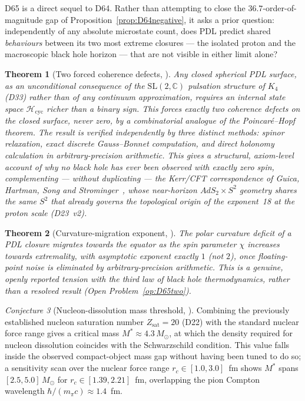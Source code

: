 \documentclass[11pt,a4paper]{article}
\theoremstyle{plain}
\newtheorem{theorem}{Theorem}[section]
\theoremstyle{definition}
\theoremstyle{remark}
\newtheorem{conjecture}[theorem]{Conjecture}
\newcommand{\Kfour}{K_4}
\newcommand{\Zsat}{Z_{\mathrm{sat}}}
\begin{document}
D65 is a direct sequel to D64. Rather than attempting to close the $36.7$-order-of-magnitude gap of Proposition~\ref{prop:D64negative}, it asks a prior question: independently of any absolute microstate count, does PDL predict shared \emph{behaviours} between its two most extreme closures --- the isolated proton and the macroscopic black hole horizon --- that are not visible in either limit alone?

\begin{theorem}[Two forced coherence defects, \cite{D65}]
\label{thm:2defects}
Any closed spherical PDL surface, as an unconditional consequence of the $\mathrm{SL}(2,\mathbb{C})$ pulsation structure of $\Kfour$ (D33) rather than of any continuum approximation, requires an internal state space $\mathcal{H}_{\mathrm{cyc}}$ richer than a binary sign. This forces exactly two coherence defects on the closed surface, never zero, by a combinatorial analogue of the Poincar\'e--Hopf theorem. The result is verified independently by three distinct methods: spinor relaxation, exact discrete Gauss--Bonnet computation, and direct holonomy calculation in arbitrary-precision arithmetic. This gives a structural, axiom-level account of why no black hole has ever been observed with exactly zero spin, complementing --- without duplicating --- the Kerr/CFT correspondence of Guica, Hartman, Song and Strominger~\cite{GuicaHartmanSongStrominger2009}, whose near-horizon $AdS_2\times S^2$ geometry shares the same $S^2$ that already governs the topological origin of the exponent~18 at the proton scale (D23~v2).
\end{theorem}

\begin{theorem}[Curvature-migration exponent, \cite{D65}]
\label{thm:exponent}
The polar curvature deficit of a PDL closure migrates towards the equator as the spin parameter $\chi$ increases towards extremality, with asymptotic exponent exactly $1$ (not $2$), once floating-point noise is eliminated by arbitrary-precision arithmetic. This is a genuine, openly reported tension with the third law of black hole thermodynamics, rather than a resolved result (Open Problem~\ref{op:D65two}).
\end{theorem}

\begin{conjecture}[Nucleon-dissolution mass threshold, \cite{D65}]
\label{conj:dissolution}
Combining the previously established nucleon saturation number $\Zsat=20$ (D22) with the standard nuclear force range gives a critical mass $M^*\approx4.3\,M_\odot$, at which the density required for nucleon dissolution coincides with the Schwarzschild condition. This value falls inside the observed compact-object mass gap without having been tuned to do so; a sensitivity scan over the nuclear force range $r_c\in[1.0,3.0]$~fm shows $M^*$ spans $[2.5,5.0]\,M_\odot$ for $r_c\in[1.39,2.21]$~fm, overlapping the pion Compton wavelength $\hbar/(m_\pi c)\approx1.4$~fm.
\end{conjecture}
\end{document}
